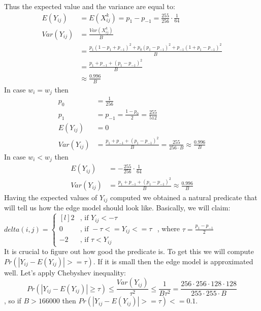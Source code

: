 \documentclass[varwidth]{standalone}
\begin{document}
Thus the expected value and the variance are equal to:
\begin{align*}
E(Y_{ij}) &= E(X^k_{ij}) = p_1 - p_{-1}=\frac{255}{256}\cdot \frac{1}{64}\\
Var(Y_{ij}) &= \frac{Var(X^k_{ij})}{B}\\
            &= \frac{p_1(1-p_1+p_{-1})^2 + p_0(p_1-p_{-1})^2 + p_{-1}(1+p_1-p_{-1})^2}{B}\\
            &= \frac{p_1 + p_{-1} + (p_1-p_{-1})^2}{B}\\
            &\approx \frac{0.996}{B}
\end{align*}
In case $w_i = w_j$ then\\
\begin{align*}
p_0 &= \frac{1}{256}\\
p_1 &= p_{-1} = \frac{1-p_0}{2} = \frac{255}{512}\\
E(Y_{ij}) &= 0\\
Var(Y_{ij}) &= \frac{p_1 + p_{-1} + (p_1-p_{-1})^2}{B} = \frac{255}{256\cdot B} \approx \frac{0.996}{B}
\end{align*}
In case $w_i < w_j$ then\\
\begin{align*}
E(Y_{ij}) &= -\frac{255}{256}\cdot \frac{1}{64}\\
Var(Y_{ij}) &= \frac{p_1 + p_{-1} + (p_1-p_{-1})^2}{B} \approx \frac{0.996}{B}
\end{align*}
Having the expected values of $Y_{ij}$ computed we obtained a natural predicate
that will tell us how the edge model should look like. Basically, we will
claim:\\
$delta(i, j) = \left\{
  \begin{matrix*}[l]
    2&\text{, if } Y_{ij} < -\tau\\
    0&\text{, if } -\tau <= Y_{ij} <= \tau\\
    -2&\text{, if } \tau < Y_{ij}
  \end{matrix*}\right.$ , where $\tau = \frac{p_1 - p_{-1}}{2}$\\
It is crucial to figure out how good the predicate is. To get this we will
compute $Pr(|Y_{ij} - E(Y_{ij})| >= \tau)$. If it is small then the edge model
is approximated well. Let's apply Chebyshev inequality:
$$
Pr(|Y_{ij} - E(Y_{ij})| \geq \tau)
  \leq \frac{Var(Y_{ij})}{\tau^2}
  \leq \frac{1}{B\tau^2}
  = \frac{256\cdot 256\cdot 128\cdot 128}{255\cdot 255\cdot B}
$$
, so if $B > 166000$ then $Pr(|Y_{ij} - E(Y_{ij})| >= \tau) <= 0.1$.
\end{document}
